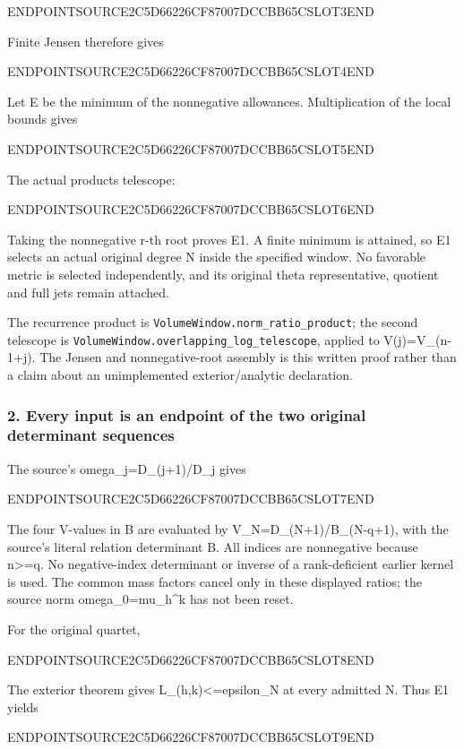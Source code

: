 ENDPOINTSOURCE2C5D66226CF87007DCCBB65CSLOT3END

Finite Jensen therefore gives

ENDPOINTSOURCE2C5D66226CF87007DCCBB65CSLOT4END

Let E be the minimum of the nonnegative allowances. Multiplication of the local bounds gives

ENDPOINTSOURCE2C5D66226CF87007DCCBB65CSLOT5END

The actual products telescope:

ENDPOINTSOURCE2C5D66226CF87007DCCBB65CSLOT6END

Taking the nonnegative r-th root proves E1. A finite minimum is attained, so E1 selects an actual original degree N inside the specified window. No favorable metric is selected independently, and its original theta representative, quotient and full jets remain attached.

The recurrence product is \texttt{VolumeWindow.norm\_ratio\_product}; the second telescope is \texttt{VolumeWindow.overlapping\_log\_telescope}, applied to V(j)=V\_(n-1+j). The Jensen and nonnegative-root assembly is this written proof rather than a claim about an unimplemented exterior/analytic declaration.

\subsubsection{2. Every input is an endpoint of the two original determinant sequences}\label{endpoint-pr23_original--every-input-is-an-endpoint-of-the-two-original-determinant-sequences}

The source's omega\_j=D\_(j+1)/D\_j gives

ENDPOINTSOURCE2C5D66226CF87007DCCBB65CSLOT7END

The four V-values in B are evaluated by V\_N=D\_(N+1)/B\_(N-q+1), with the source's literal relation determinant B. All indices are nonnegative because n\textgreater=q. No negative-index determinant or inverse of a rank-deficient earlier kernel is used. The common mass factors cancel only in these displayed ratios; the source norm omega\_0=mu\_h\^{}k has not been reset.

For the original quartet,

ENDPOINTSOURCE2C5D66226CF87007DCCBB65CSLOT8END

The exterior theorem gives L\_(h,k)\textless=epsilon\_N at every admitted N. Thus E1 yields

ENDPOINTSOURCE2C5D66226CF87007DCCBB65CSLOT9END

